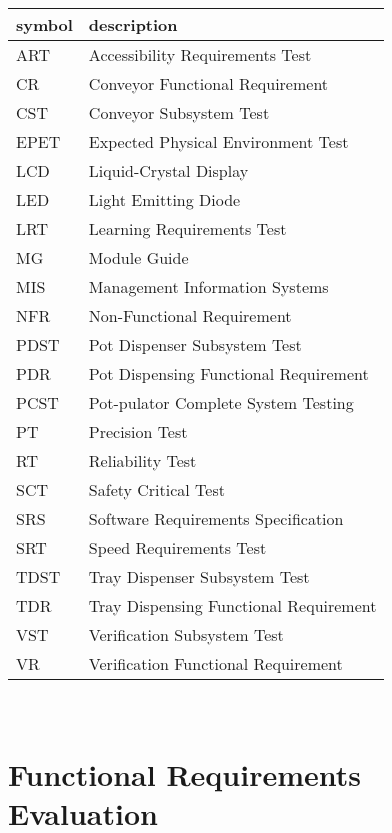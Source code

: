 \documentclass[12pt, titlepage]{article}
\begin{document}
\renewcommand{\arraystretch}{1.2}
\begin{tabular}{l l} 
  \toprule		
  \textbf{symbol} & \textbf{description}\\
  \midrule 
  ART & Accessibility Requirements Test\\
CR & Conveyor Functional Requirement\\
CST & Conveyor Subsystem Test\\
EPET & Expected Physical Environment Test\\
LCD & Liquid-Crystal Display\\
LED & Light Emitting Diode\\
LRT & Learning Requirements Test\\
MG & Module Guide\\
MIS & Management Information Systems\\
NFR & Non-Functional Requirement\\
PDST & Pot Dispenser Subsystem Test\\
PDR & Pot Dispensing Functional Requirement\\
PCST & Pot-pulator Complete System Testing\\
PT & Precision Test\\
RT & Reliability Test\\
SCT & Safety Critical Test\\
SRS & Software Requirements Specification\\
SRT & Speed Requirements Test\\
TDST & Tray Dispenser Subsystem Test\\
TDR & Tray Dispensing Functional Requirement\\
VST & Verification Subsystem Test\\
VR & Verification Functional Requirement\\
  \bottomrule
\end{tabular}\\

\newpage

\tableofcontents

\listoftables %

\listoffigures %

\newpage


\section{Functional Requirements Evaluation}
\end{document}
